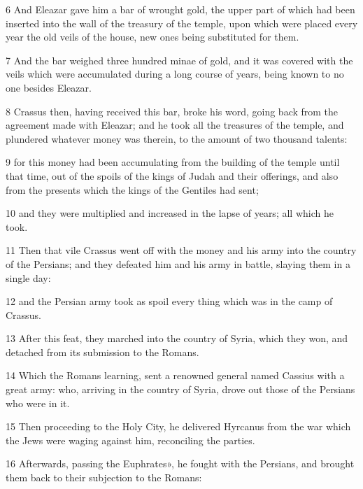 \par 6 And Eleazar gave him a bar of wrought gold, the upper part of which had been inserted into the wall of the treasury of the temple, upon which were placed every year the old veils of the house, new ones being substituted for them. 

\par 7 And the bar weighed three hundred minae of gold, and it was covered with the veils which were accumulated during a long course of years, being known to no one besides Eleazar. 

\par 8 Crassus then, having received this bar, broke his word, going back from the agreement made with Eleazar; and he took all the treasures of the temple, and plundered whatever money was therein, to the amount of two thousand talents: 

\par 9 for this money had been accumulating from the building of the temple until that time, out of the spoils of the kings of Judah and their offerings, and also from the presents which the kings of the Gentiles had sent; 

\par 10 and they were multiplied and increased in the lapse of years; all which he took. 

\par 11 Then that vile Crassus went off with the money and his army into the country of the Persians; and they defeated him and his army in battle, slaying them in a single day: 

\par 12 and the Persian army took as spoil every thing which was in the camp of Crassus. 

\par 13 After this feat, they marched into the country of Syria, which they won, and detached from its submission to the Romans. 

\par 14 Which the Romans learning, sent a renowned general named Cassius with a great army: who, arriving in the country of Syria, drove out those of the Persians who were in it. 

\par 15 Then proceeding to the Holy City, he delivered Hyrcanus from the war which the Jews were waging against him, reconciling the parties. 

\par 16 Afterwards, passing the Euphrates», he fought with the Persians, and brought them back to their subjection to the Romans: 

